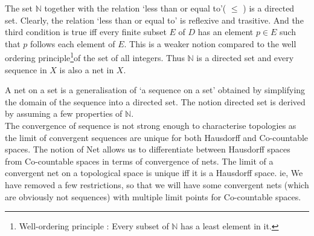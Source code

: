 \begin{remark}
	The set \( \mathbb{N} \) together with the relation `less than or equal to'( \( \le \) ) is a directed set. Clearly, the relation `less than or equal to' is reflexive and trasitive. And the third condition is true iff every finite subset \( E \) of \( D \) has an element \( p \in E \) such that \( p \) follows each element of \( E \). This is a weaker notion compared to the well ordering principle\footnote{Well-ordering principle : Every subset of \( \mathbb{N} \) has a least element in it.}of the set of all integers. Thus \( \mathbb{N} \) is a directed set and every sequence in \( X \) is also a net in \( X \). 
\end{remark}

\begin{remark}
	A net on a set is a generalisation of `a sequence on a set' obtained by simplifying the domain of the sequence into a directed set. The notion directed set is derived by assuming a few properties of \( \mathbb{N} \).\\

	The convergence of sequence is not strong enough to characterise topologies as the limit of convergent sequences are unique for both Hausdorff and Co-countable spaces. The notion of Net allows us to differentiate between Hausdorff spaces from Co-countable spaces in terms of convergence of nets. The limit of a convergent net on a topological space is unique iff it is a Hausdorff space. ie, We have removed a few restrictions, so that we will have some convergent nets (which are obviously not sequences) with multiple limit points for Co-countable spaces.
\end{remark}

